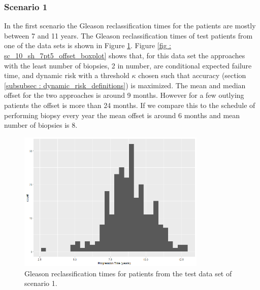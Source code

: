 \subsubsection{Scenario 1}
In the first scenario the Gleason reclassification times for the patients are mostly between 7 and 11 years. The Gleason reclassification times of test patients from one of the data sets is shown in Figure \ref{fig : sc_10_sh_7pt5_progression_hist}. Figure \ref{fig : sc_10_sh_7pt5_offset_boxplot} shows that, for this data set the approaches with the least number of biopsies, 2 in number, are conditional expected failure time, and dynamic risk with a threshold $\kappa$ chosen such that accuracy (section \ref{subsubsec : dynamic_risk_definitions}) is maximized. The mean and median offset for the two approaches is around 9 months. However for a few outlying patients the offset is more than 24 months. If we compare this to the schedule of performing biopsy every year the mean offset is around 6 months and mean number of biopsies is 8. 

\begin{figure}[H]
\centering
\captionsetup{justification=centering}
\includegraphics[width=0.8\textwidth]{sim_study_res_sc_10_sh_7pt5/progression_hist.png}
\caption{\label{fig : sc_10_sh_7pt5_progression_hist} Gleason reclassification times for patients from the test data set of scenario 1.}
\end{figure}

